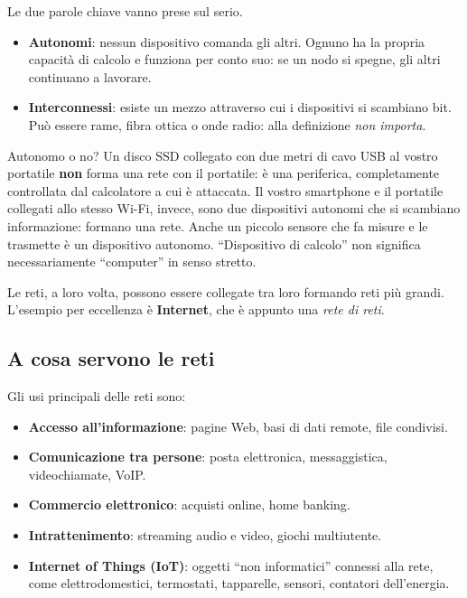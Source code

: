 Le due parole chiave vanno prese sul serio.

\begin{itemize}
    \item \textbf{Autonomi}: nessun dispositivo comanda gli altri. Ognuno ha la propria capacità di
          calcolo e funziona per conto suo: se un nodo si spegne, gli altri continuano a lavorare.
    \item \textbf{Interconnessi}: esiste un mezzo attraverso cui i dispositivi si scambiano bit. Può
          essere rame, fibra ottica o onde radio: alla definizione \emph{non importa}.
\end{itemize}

\begin{esempio}{Autonomo o no?}
Un disco SSD collegato con due metri di cavo USB al vostro portatile \textbf{non} forma una rete
con il portatile: è una periferica, completamente controllata dal calcolatore a cui è attaccata.
Il vostro smartphone e il portatile collegati allo stesso Wi-Fi, invece, sono due dispositivi
autonomi che si scambiano informazione: formano una rete. Anche un piccolo sensore che fa
misure e le trasmette è un dispositivo autonomo. ``Dispositivo di calcolo'' non significa
necessariamente ``computer'' in senso stretto.
\end{esempio}

Le reti, a loro volta, possono essere collegate tra loro formando reti più grandi.
L'esempio per eccellenza è \textbf{Internet}, che è appunto una \emph{rete di reti}.


\subsection{A cosa servono le reti}

Gli usi principali delle reti sono:

\begin{itemize}
    \item \textbf{Accesso all'informazione}: pagine Web, basi di dati remote, file condivisi.
    \item \textbf{Comunicazione tra persone}: posta elettronica, messaggistica, videochiamate, VoIP.
    \item \textbf{Commercio elettronico}: acquisti online, home banking.
    \item \textbf{Intrattenimento}: streaming audio e video, giochi multiutente.
    \item \textbf{Internet of Things (IoT)}: oggetti ``non informatici'' connessi alla rete, come
          elettrodomestici, termostati, tapparelle, sensori, contatori dell'energia.
\end{itemize}

